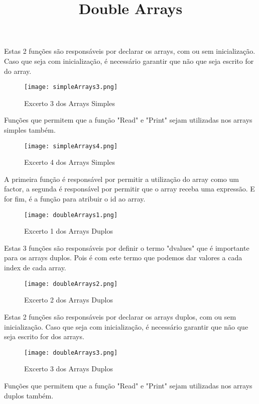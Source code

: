\documentclass[11pt,a4paper]{report}%
\begin{document}
Estas 2 funções são responsáveis por declarar os arrays, com ou sem inicialização. Caso que seja com inicialização, é necessário garantir que não que seja escrito for do array.\\

\begin{figure}[htbp]
\centerline{\texttt{[image: simpleArrays3.png]}}
\caption{Excerto 3 dos Arrays Simples}
\label{fig}
\end{figure}

Funções que permitem que a função "Read" e "Print" sejam utilizadas nos arrays simples também.\\

\newpage
\begin{figure}[htbp]
\centerline{\texttt{[image: simpleArrays4.png]}}
\caption{Excerto 4 dos Arrays Simples}
\label{fig}
\end{figure}

A primeira função é responsável por permitir a utilização do array como um factor, a segunda é responsável por permitir que o array receba uma expressão. E for fim, é a função para atribuir o id ao array.


\title{\textbf{Double Arrays}}
\begin{figure}[htbp]
\centerline{\texttt{[image: doubleArrays1.png]}}
\caption{Excerto 1 dos Arrays Duplos}
\label{fig}
\end{figure}

Estas 3 funções são responsáveis por definir o termo "d\textunderscore values" que é importante para os arrays duplos. Pois é com este termo que podemos dar valores a cada index de cada array.

\newpage

\begin{figure}[htbp]
\centerline{\texttt{[image: doubleArrays2.png]}}
\caption{Excerto 2 dos Arrays Duplos}
\label{fig}
\end{figure}

Estas 2 funções são responsáveis por declarar os arrays duplos, com ou sem inicialização. Caso que seja com inicialização, é necessário garantir que não que seja escrito for dos arrays.\\


\begin{figure}[htbp]
\centerline{\texttt{[image: doubleArrays3.png]}}
\caption{Excerto 3 dos Arrays Duplos}
\label{fig}
\end{figure}

Funções que permitem que a função "Read" e "Print" sejam utilizadas nos arrays duplos também.\\
\end{document}
